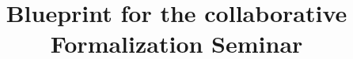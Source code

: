 \title{Blueprint for the collaborative Formalization Seminar}

\author{}

\maketitle

\tableofcontents







